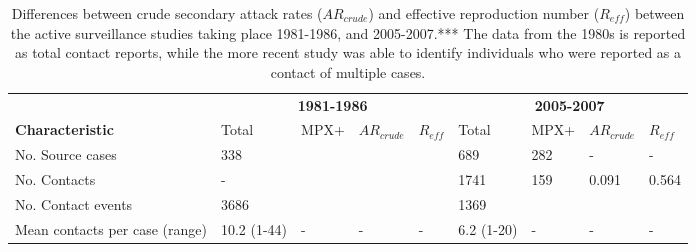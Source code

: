 \begin{table} %
\centering %
\caption{Differences between crude secondary attack rates ($AR_{crude}$) and effective reproduction number ($R_{eff}$) between the active surveillance studies taking place 1981-1986, and 2005-2007.*** The data from the 1980s is reported as total contact reports, while the more recent study was able to identify individuals who were reported as a contact of multiple cases.} %
\begin{tabular}{p{3.2cm}p{1.1cm}p{1cm}p{1cm}p{1.1cm}p{1.1cm}p{1cm}p{1cm}p{1.1cm}} %
\toprule %
& \multicolumn{4}{c}{\textbf{1981-1986}} & \multicolumn{4}{c}{\textbf{2005-2007}}\\ %
\cmidrule(l){2-5} \cmidrule(l){6-9} %

\textbf{Characteristic} & Total & MPX+ & $AR_{crude}$ & $R_{eff}$ & Total & MPX+ & $AR_{crude}$ & $R_{eff}$ \\ %
\midrule %
No. Source cases & 338 & & & & 689 & 282 & - & - \\ %
No. Contacts & - & & & & 1741 & 159 & 0.091 & 0.564 \\ %
No. Contact events & 3686 & & & & 1369 & & & \\ [0.1cm]
Mean contacts per case (range) & 10.2 (1-44) & - & - & - & 6.2 (1-20) & - & - & - \\ 
\bottomrule %
\end{tabular}
\end{table}